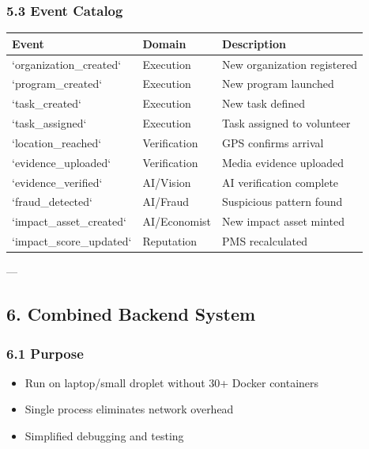 \documentclass[11pt,a4paper]{article}
\begin{document}
\subsubsection{5.3 Event Catalog}

\begin{table}[H]
\centering
\begin{tabular}{|l|l|l|}
\hline
Event & Domain & Description \\
\hline
`organization_created` & Execution & New organization registered \\
\hline
`program_created` & Execution & New program launched \\
\hline
`task_created` & Execution & New task defined \\
\hline
`task_assigned` & Execution & Task assigned to volunteer \\
\hline
`location_reached` & Verification & GPS confirms arrival \\
\hline
`evidence_uploaded` & Verification & Media evidence uploaded \\
\hline
`evidence_verified` & AI/Vision & AI verification complete \\
\hline
`fraud_detected` & AI/Fraud & Suspicious pattern found \\
\hline
`impact_asset_created` & AI/Economist & New impact asset minted \\
\hline
`impact_score_updated` & Reputation & PMS recalculated \\
\hline
\end{tabular}
\end{table}

---

\subsection{6. Combined Backend System}

\subsubsection{6.1 Purpose}


\begin{itemize}
\item Run on laptop/small droplet without 30+ Docker containers
\item Single process eliminates network overhead
\item Simplified debugging and testing
\end{itemize}
\end{document}
